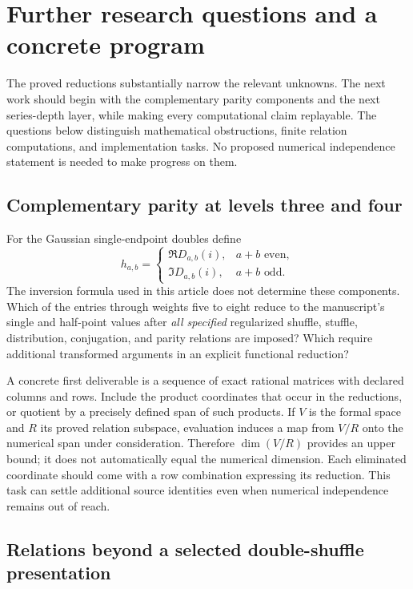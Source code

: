 \section{Further research questions and a concrete program}
\label{sec:research}

The proved reductions substantially narrow the relevant unknowns. The
next work should begin with the complementary parity components and
the next series-depth layer, while making every computational claim
replayable. The questions below distinguish mathematical obstructions,
finite relation computations, and implementation tasks. No proposed
numerical independence statement is needed to make progress on them.

\subsection{Complementary parity at levels three and four}

For the Gaussian single-endpoint doubles define
\[
 h_{a,b}=
 \begin{cases}
   \Re D_{a,b}(i),&a+b\text{ even},\\
   \Im D_{a,b}(i),&a+b\text{ odd}.
 \end{cases}
\]
The inversion formula used in this article does not determine these
components. Which of the entries through weights five to eight reduce
to the manuscript's single and half-point values after \emph{all
specified} regularized shuffle, stuffle, distribution, conjugation,
and parity relations are imposed? Which require additional transformed
arguments in an explicit functional reduction?

A concrete first deliverable is a sequence of exact rational matrices
with declared columns and rows. Include the product coordinates that
occur in the reductions, or quotient by a precisely defined span of
such products. If $V$ is the formal space and $R$ its proved relation
subspace, evaluation induces a map from $V/R$ onto the numerical span
under consideration. Therefore $\dim(V/R)$ provides an upper bound;
it does not automatically equal the numerical dimension. Each
eliminated coordinate should come with a row combination expressing
its reduction. This task can settle additional source identities even
when numerical independence remains out of reach.

\subsection{Relations beyond a selected double-shuffle presentation}

